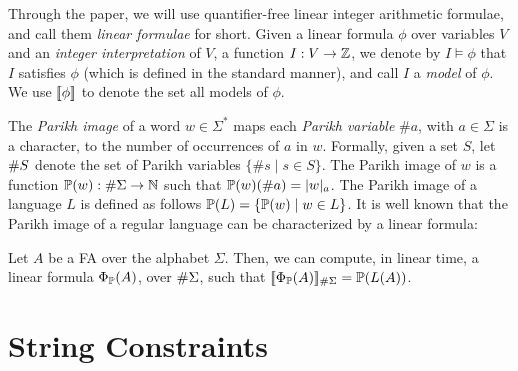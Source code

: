 \documentclass[sigplan,review,anonymous]{acmart}\settopmatter{printfolios=true,printccs=false,printacmref=false}
\begin{document}
Through the paper, we will use quantifier-free linear integer arithmetic formulae, and call them \emph{linear formulae} for short.  
Given a linear formula $\phi$ over variables $V$ and an \emph{integer interpretation} of $V$, a function $I:V\rightarrow \mathbb{Z}$, 
we denote by $I\models \phi$ that $I$ satisfies $\phi$ (which is defined in the standard manner), and call $I$ a \emph{model} of $\phi$. 
We use $[\![\phi]\!]$ to denote the set all models of $\phi$.%


The \emph{Parikh image} of a word $w\in \Sigma^*$ maps each \emph{Parikh variable} $\#a$, with $a \in \Sigma$ is a character, to the number of occurrences of $a$ in $w$.
Formally, given a set $S$, let $\#{S}$ denote the set of Parikh variables $\{\#s \mid s\in S\}$. 
The Parikh image of $w$ is a function $\mathbb{P}{(w)}:\#{\Sigma} \rightarrow \mathbb{N}$ such that $\mathbb{P}{(w)} (\#a) = |w|_a$. 
The Parikh image of a language $L$ is defined as follows $\mathbb{P}{(L)} = \{\mathbb{P}{(w)} \mid w \in L\}$. %
%
It is well known that the Parikh image of a regular language  can be  characterized by a linear formula:



\begin{lemma}
Let $A$ be a FA over the alphabet $\Sigma$. Then, we can compute, in linear time,  a linear formula $\Phi_{\mathbb{P}}(A)$, over $\#{\Sigma}$, such that $[\![\Phi_{\mathbb{P}}(A)]\!]_{\#\Sigma} = \mathbb{P}{(L(A))}$.
\end{lemma}



 


\section{String Constraints} \label{section:sc}
\end{document}
